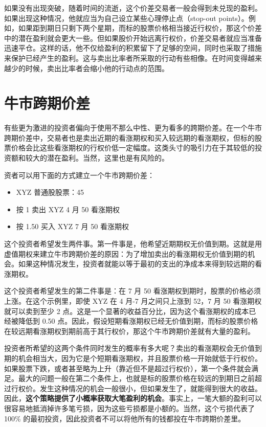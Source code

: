 \documentclass{article}
\begin{document}
如果没有出现突破，随着时间的流逝，这个价差交易者一般会得到未兑现的盈利。如果出现这种情况，他就应当为自己设立某些心理停止点（stop-out points）。例如，如果距到期日只剩下两个星期，而标的股票价格相当接近行权价，那这个价差中的潜在盈利就会更大一些。但如果股价开始远离行权价，价差交易者就应当准备迅速平仓。这样的话，他不仅给盈利的积累留下了足够的空间，同时也采取了措施来保护已经产生的盈利。这与卖出比率者所采取的行动有些相像。在时间变得越来越少的时候，卖出比率者会缩小他的行动点的范围。

\section{牛市跨期价差}
有些更为激进的投资者偏向于使用不那么中性、更为看多的跨期价差。在一个牛市跨期价差中，交易者也是卖出近期的看涨期权和买入较远期的看涨期权，但标的股票价格会比这些看涨期权的行权价低一定幅度。这类头寸的吸引力在于其较低的投资额和较大的潜在盈利。当然，这里也是有风险的。

资者可以用下面的方式建立一个牛市跨期价差：
\begin{itemize}
    \item XYZ 普通股股票：45
    \item 按 1 卖出 XYZ 4 月 50 看涨期权
    \item 按 1.50 买入 XYZ 7 月 50 看涨期权
\end{itemize}
这个投资者希望发生两件事。第一件事是，他希望近期期权无价值到期。这就是用虚值期权来建立牛市跨期价差的原因：为了增加卖出的看涨期权无价值到期的机会。如果这种情况发生，投资者就能以等于最初的支出的净成本来得到较远期的看涨期权。

这个投资者希望发生的第二件事是：在 7 月 50 看涨期权到期时，股票的价格必须上涨。在这个示例里，即使 XYZ 在 4 月-7 月之间只上涨到 52，7 月 50 看涨期权就可以卖到至少 2 点。这是一个显著的收益百分比，因为这个看涨期权的成本已经被降低到 0.50 点。因此，假设短期看涨期权已经无价值到期，而标的股票价格在较远期看涨期权到期前高于其行权价，那这个牛市跨期价差就有大量的盈利。

投资者所希望的这两个条件同时发生的概率有多大呢？卖出的看涨期权会无价值到期的机会相当大，因为它是个短期看涨期权，并且股票价格一开始就低于行权价。如果股票下跌，或者甚至略为上升（靠近但不是超过行权价），第一个条件就会满足。最大的问题一般在第二个条件上，也就是标的股票价格在较远的到期日之前超过行权价。发生这种情况的机会一般很小，但如果发生了，就能得到很大的收益。因此，\textbf{这个策略提供了小概率获取大笔盈利的机会}。事实上，一笔大额的盈利可以很容易地抵消掉许多笔亏损，因为这些亏损都是小额的。当然，这个亏损代表了 100\% 的最初投资，因此投资者不可以将他所有的钱都投在牛市跨期价差里。
\end{document}

